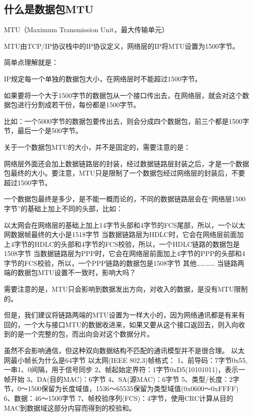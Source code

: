 \documentclass[a4paper,left=1.5cm,right=1.5cm,11pt]{article}
\begin{document}
\tableofcontents

\clearpage

\subsection{什么是数据包MTU}
MTU（Maximum Transmission Unit，最大传输单元）
 
MTU由TCP/IP协议栈中的IP协议定义，网络层的IP将MTU设置为1500字节。
 
简单点理解就是：
 
IP规定每一个单独的数据包大小，在网络层时不能超过1500字节。
 
如果要将一个大于1500字节的数据包从一个接口传出去，在网络层，就会对这个数据包进行分割成若干份，每份都是1500字节。
 
比如：一个5000字节的数据包要传出去，则会分成四个数据包，前三个都是1500字节，最后一个是500字节。
 
关于一个数据包MTU的大小，并不是固定的，需要注意的是：
 
网络层外面还会加上数据链路层的封装，经过数据链路层封装之后，才是一个数据包最终的大小。要注意，MTU只是限制了一个数据包经过网络层的封装后，不要超过1500字节。
 
一个数据包最终是多少，是不能一概而论的，不同的数据链路层会在“网络层1500字节”的基础上加上不同的头部，比如：
 
以太网会在网络层的基础上加上14字节头部和4字节的FCS尾部，所以，一个以太网数据帧最终的大小是1518字节
当数据链路层为HDLC时，它会在网络层前面加上4字节的HDLC的头部和4字节的FCS校验，所以，一个HDLC链路的数据包是1508字节
当数据链路层为PPP时，它会在网络层前面加上4字节的PPP的头部和4字节的FCS校验，所以，一个PPP链路的数据包是1508字节
其他…………
当链路两端的数据包MTU设置不一致时，影响大吗？
 
需要注意的是，MTU只会影响到数据发出方向，对收入的数据，是没有MTU限制的。
 
但是，我们建议将链路两端的MTU设置为一样大小的，因为网络通讯都是有来有回的，一个大与接口MTU的数据收进来，如果又要从这个接口返回去，则入向收到的是一个完整的包，而出向会对这个数据分片。
 
虽然不会影响通信，但这种双向数据结构不匹配的通讯模型并不是很合理。
以太网最小帧长为什么是64字节
以太网(IEEE 802.3)帧格式：
1、前导码：7字节0x55,一串1、0间隔，用于信号同步
2、帧起始定界符：1字节0xD5(10101011)，表示一帧开始
3、DA(目的MAC)：6字节
4、SA(源MAC)：6字节
5、类型/长度：2字节，0～1500保留为长度域值，1536～65535保留为类型域值(0x0600～0xFFFF)
6、数据：46～1500字节
7、帧校验序列(FCS)：4字节，使用CRC计算从目的MAC到数据域这部分内容而得到的校验和。
\end{document}
